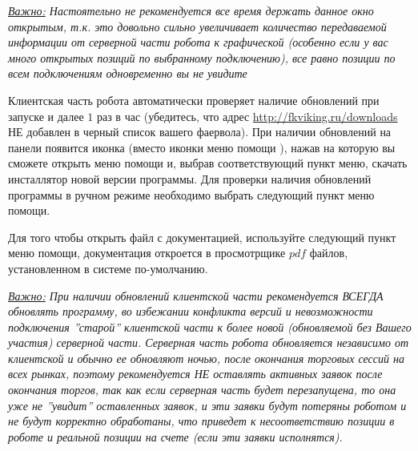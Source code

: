 \noindent\textit{\underline{Важно:} Настоятельно не рекомендуется все время держать данное окно открытым, т.к. это довольно сильно увеличивает количество передаваемой информации от серверной части робота к графической (особенно если у
вас много открытых позиций по выбранному подключению), все равно позиции по всем подключениям одновременно вы не увидите}


Клиентская часть робота автоматически проверяет наличие обновлений при запуске и далее $1$ раз в час (убедитесь, что адрес \href{http://fkviking.ru/downloads}{http://fkviking.ru/downloads}
НЕ добавлен в черный список вашего фаервола). При наличии обновлений на панели появится иконка  (вместо иконки меню помощи
), нажав на которую вы сможете открыть меню помощи и, выбрав соответствующий пункт меню, скачать инсталлятор новой версии программы.
Для проверки наличия обновлений программы в ручном режиме необходимо выбрать следующий  пункт
меню помощи.

Для того чтобы открыть файл с документацией, используйте следующий  пункт меню помощи, документация откроется в просмотрщике $pdf$ файлов,
установленном в системе по-умолчанию.\newline

\noindent\textit{\underline{Важно:} При наличии обновлений клиентской части рекомендуется ВСЕГДА обновлять программу, во избежании конфликта версий и невозможности подключения
''старой'' клиентской части к более новой (обновляемой без Вашего участия) серверной части. Серверная часть робота обновляется независимо от клиентской и обычно ее обновляют
ночью, после окончания торговых сессий на всех рынках, поэтому рекомендуется НЕ оставлять активных заявок после окончания торгов, так как если серверная часть будет
перезапущена, то она уже не ''увидит'' оставленных заявок, и эти заявки будут потеряны роботом и не будут корректно обработаны, что приведет к несоответствию позиции в роботе
и реальной позиции на счете (если эти заявки исполнятся).}

\label{round_trip}

